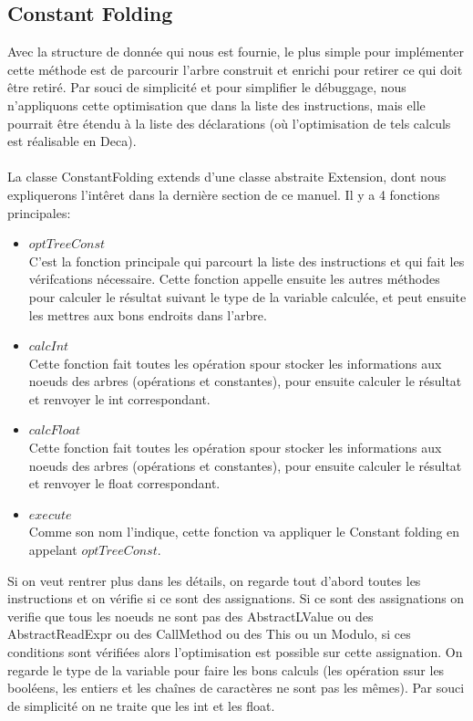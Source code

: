 \documentclass[a4paper]{article}
\begin{document}
\subsection{Constant Folding}
Avec la structure de donnée qui nous est fournie, le plus simple pour implémenter cette méthode est de parcourir l'arbre construit et enrichi pour retirer ce qui doit être retiré. Par souci de simplicité et pour simplifier le débuggage, nous n'appliquons cette optimisation que dans la liste des instructions, mais elle pourrait être étendu à la liste des déclarations (où l'optimisation de tels calculs est réalisable en Deca).\\ \\
La classe ConstantFolding extends d'une classe abstraite Extension, dont nous expliquerons l'intêret dans la dernière section de ce manuel. Il y a 4 fonctions principales:
\begin{itemize}
\item \texttt{$optTreeConst$} \\
C'est la fonction principale qui parcourt la liste des instructions et qui fait les vérifcations nécessaire. Cette fonction appelle ensuite les autres méthodes pour calculer le résultat suivant le type de la variable calculée, et peut ensuite les mettres aux bons endroits dans l'arbre.\\
\item \texttt{$calcInt$} \\
Cette fonction fait toutes les opération spour stocker les informations aux noeuds des arbres (opérations et constantes), pour ensuite calculer le résultat et renvoyer le int correspondant.\\
\item \texttt{$calcFloat$} \\
Cette fonction fait toutes les opération spour stocker les informations aux noeuds des arbres (opérations et constantes), pour ensuite calculer le résultat et renvoyer le float correspondant.\\
\item \texttt{$execute$}\\
Comme son nom l'indique, cette fonction va appliquer le Constant folding en appelant $optTreeConst$.\\
 \end{itemize}
Si on veut rentrer plus dans les détails, on regarde tout d'abord toutes les instructions et on vérifie si ce sont des assignations. Si ce sont des assignations on verifie que tous les noeuds ne sont pas des AbstractLValue ou des AbstractReadExpr ou des CallMethod ou des This ou un Modulo, si ces conditions sont vérifiées alors l'optimisation est possible sur cette assignation. On regarde le type de la variable pour faire les bons calculs (les opération ssur les booléens, les entiers et les chaînes de caractères ne sont pas les mêmes). Par souci de simplicité on ne traite que les int et les float.\\ \\
\end{document}

